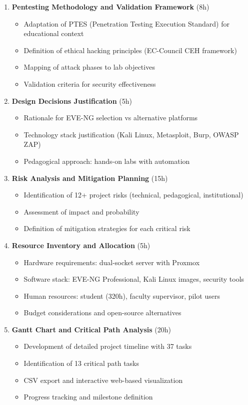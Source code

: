 \begin{enumerate}
\item \textbf{Pentesting Methodology and Validation Framework} (8h)
\begin{itemize}
\item Adaptation of PTES (Penetration Testing Execution Standard) for educational context
\item Definition of ethical hacking principles (EC-Council CEH framework)
\item Mapping of attack phases to lab objectives
\item Validation criteria for security effectiveness
\end{itemize}

\item \textbf{Design Decisions Justification} (5h)
\begin{itemize}
\item Rationale for EVE-NG selection vs alternative platforms
\item Technology stack justification (Kali Linux, Metasploit, Burp, OWASP ZAP)
\item Pedagogical approach: hands-on labs with automation
\end{itemize}

\item \textbf{Risk Analysis and Mitigation Planning} (15h)
\begin{itemize}
\item Identification of 12+ project risks (technical, pedagogical, institutional)
\item Assessment of impact and probability
\item Definition of mitigation strategies for each critical risk
\end{itemize}

\item \textbf{Resource Inventory and Allocation} (5h)
\begin{itemize}
\item Hardware requirements: dual-socket server with Proxmox
\item Software stack: EVE-NG Professional, Kali Linux images, security tools
\item Human resources: student (320h), faculty supervisor, pilot users
\item Budget considerations and open-source alternatives
\end{itemize}

\item \textbf{Gantt Chart and Critical Path Analysis} (20h)
\begin{itemize}
\item Development of detailed project timeline with 37 tasks
\item Identification of 13 critical path tasks
\item CSV export and interactive web-based visualization
\item Progress tracking and milestone definition
\end{itemize}

\end{enumerate}

